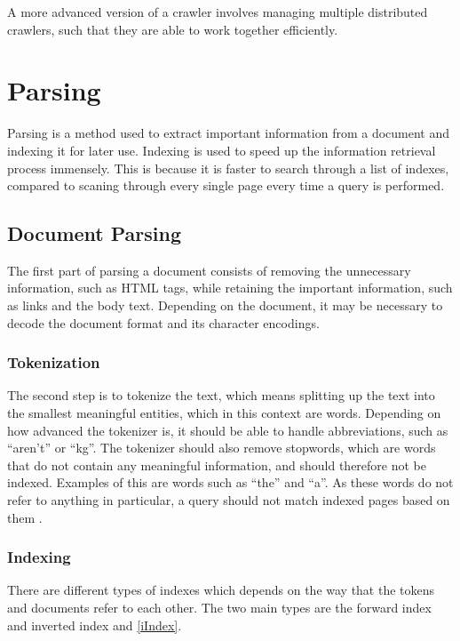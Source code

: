 
A more advanced version of a crawler involves managing multiple distributed
crawlers, such that they are able to work together efficiently.

\section{Parsing} \label{sec:parsing}
Parsing is a method used to extract important information from a document and
indexing it for later use. Indexing is used to speed up the information
retrieval process immensely. This is because it is faster to search through a
list of indexes, compared to scaning through every single page every time a
query is performed.

\subsection{Document Parsing}
The first part of parsing a document consists of removing the unnecessary
information, such as HTML tags, while retaining the important information, such
as links and the body text. Depending on the document, it may be necessary to
decode the document format and its character encodings.

\subsubsection{Tokenization}
The second step is to tokenize the text, which means splitting up the text into
the smallest meaningful entities, which in this context are words. Depending on
how advanced the tokenizer is, it should be able to handle abbreviations,
such as ``aren't'' or ``kg''. The tokenizer should also remove stopwords,
which are words that do not contain any meaningful information,
and should therefore not be indexed. Examples of this are words such as ``the''
and ``a''.
As these words do not refer to anything in particular, a query should not match
indexed pages based on them \citep[Ch.
2]{manning2008introduction}.

\subsubsection{Indexing}
There are different types of indexes which depends on the way that the tokens
and documents refer to each other. The two main types are the forward index and
inverted index and \autoref{iIndex}.

